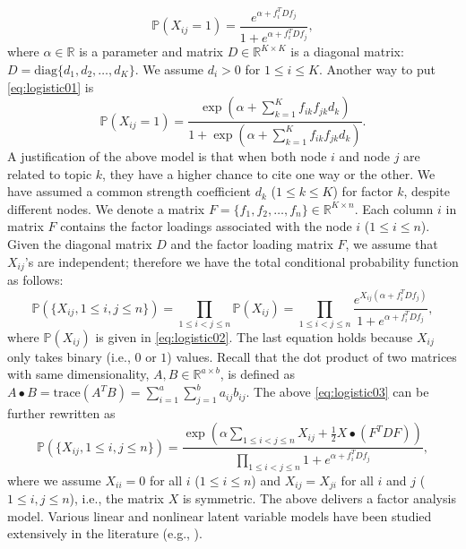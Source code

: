 \documentclass[AMS,STIX1COL]{WileyNJD-v2}
\begin{document}
\begin{equation}
\label{eq:logistic01}
\mathbb{P}(X_{ij}=1) = \frac{e^{\alpha + f_i^T D f_j }}{1 + e^{\alpha + f_i^T D f_j }},
\end{equation}
where $\alpha \in \mathbb{R}$ is a parameter and matrix $D \in \mathbb{R}^{K \times K}$ is a diagonal matrix: $D = \mbox{diag}\{d_{1},d_{2},\ldots,d_{K}\}$.
We assume $d_{i} > 0$ for $1 \le i \le K$.
Another way to put \eqref{eq:logistic01} is
\begin{equation}
\label{eq:logistic02}
\mathbb{P}(X_{ij}=1) = \frac{\exp\left(\alpha + \sum_{k=1}^K f_{ik}f_{jk}d_{k} \right)}{1 + \exp\left(\alpha + \sum_{k=1}^K f_{ik}f_{jk}d_{k} \right)}.
\end{equation}
A justification of the above model is that when both node $i$ and node $j$ are related to topic $k$, they have a higher chance to cite one way or the other.
We have assumed a common strength coefficient $d_k$ ($1\le k \le K$) for factor $k$, despite different nodes.
We denote a matrix $F = \{f_1, f_2, \ldots, f_n\} \in \mathbb{R}^{K \times n}$.
Each column $i$ in matrix $F$ contains the factor loadings associated with the node $i$ ($1\le i \le n$).
Given the diagonal matrix $D$ and the factor loading matrix $F$, we assume that $X_{ij}$'s are independent; therefore we have the total conditional probability function as follows:
\begin{equation}
\label{eq:logistic03}
\mathbb{P}(\{X_{ij}, 1\le i,j \le n\})
= \prod_{1\le i<j \le n} \mathbb{P}(X_{ij})
= \prod_{1\le i<j \le n}  \frac{e^{X_{ij}(\alpha + f_i^T D f_j) }}{1 + e^{\alpha + f_i^T D f_j }},
\end{equation}
where $\mathbb{P}(X_{ij})$ is given in \eqref{eq:logistic02}.
The last equation holds because $X_{ij}$ only takes binary (i.e., $0$ or $1$) values.
Recall that the dot product of two matrices with same dimensionality, $A,B\in \mathbb{R}^{a \times b}$, is defined as $A\bullet B=\mbox{trace}(A^T B) = \sum_{i=1}^a\sum_{j=1}^b a_{ij}b_{ij}$.
The above \eqref{eq:logistic03} can be further rewritten as
\begin{equation}
\label{eq:logistic04}
\mathbb{P}(\{X_{ij}, 1\le i,j \le n\})
= \frac{\exp\left(\alpha \sum_{1\le i< j\le n}X_{ij} +\frac{1}{2} X \bullet (F^T D F)\right)}{\prod_{1\le i<j \le n}  1 + e^{\alpha + f_i^T D f_j }},
\end{equation}
where we assume $X_{ii}=0$ for all $i$ ($1\le i \le n$) and $X_{ij} = X_{ji}$ for all $i$ and $j$ ($1\le i,j \le n$), i.e., the matrix $X$ is symmetric.
The above delivers a factor analysis model.
Various linear and nonlinear latent variable models have been studied extensively in the literature (e.g., \cite{joreskog1969general, mcdonald2014factor,lord2008statistical, rasch1980probabilistic, harman1960modern, joreskog1970general}).
\end{document}
